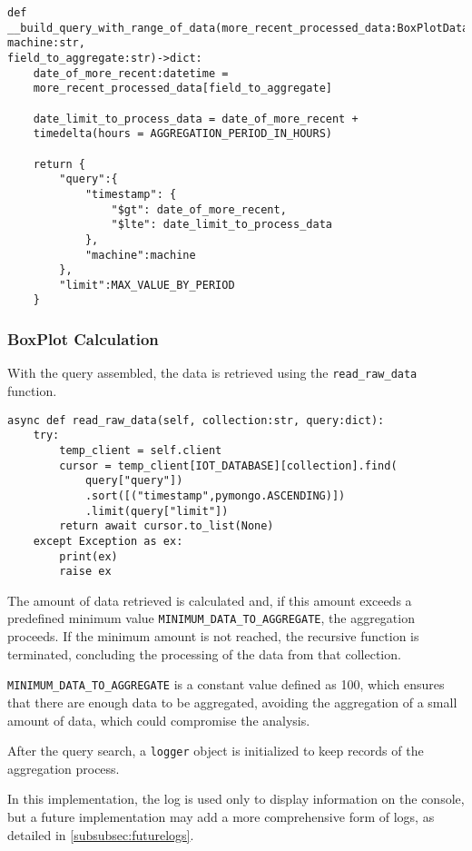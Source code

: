 \begin{verbatim}
def __build_query_with_range_of_data(more_recent_processed_data:BoxPlotData,
machine:str,
field_to_aggregate:str)->dict:
    date_of_more_recent:datetime = 
    more_recent_processed_data[field_to_aggregate]

    date_limit_to_process_data = date_of_more_recent + 
    timedelta(hours = AGGREGATION_PERIOD_IN_HOURS)

    return {
        "query":{
            "timestamp": {
                "$gt": date_of_more_recent,
                "$lte": date_limit_to_process_data
            },
            "machine":machine
        },
        "limit":MAX_VALUE_BY_PERIOD
    }

\end{verbatim}

\subsubsection{BoxPlot Calculation}
With the query assembled, the data is retrieved using the \texttt{read\_raw\_data} function.

\begin{verbatim}
async def read_raw_data(self, collection:str, query:dict):
    try:
        temp_client = self.client
        cursor = temp_client[IOT_DATABASE][collection].find(
            query["query"])
            .sort([("timestamp",pymongo.ASCENDING)])
            .limit(query["limit"])
        return await cursor.to_list(None)
    except Exception as ex:
        print(ex)
        raise ex
\end{verbatim}

The amount of data retrieved is calculated and, if this amount exceeds a predefined minimum value \texttt{MINIMUM\_DATA\_TO\_AGGREGATE}, the aggregation proceeds. If the minimum amount is not reached, the recursive function is terminated, concluding the processing of the data from that collection.

\texttt{MINIMUM\_DATA\_TO\_AGGREGATE} is a constant value defined as 100, which ensures that there are enough data to be aggregated, avoiding the aggregation of a small amount of data, which could compromise the analysis.

After the query search, a \texttt{logger} object is initialized to keep records of the aggregation process.

In this implementation, the log is used only to display information on the console, but a future implementation may add a more comprehensive form of logs, as detailed in \ref{subsubsec:futurelogs}.

